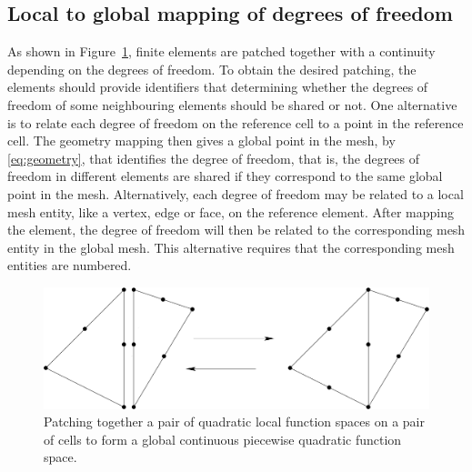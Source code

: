 \subsection{Local to global mapping of degrees of freedom}

As shown in Figure~\ref{fig:kirby-1:patch}, finite elements 
are patched together with a continuity depending on the degrees of freedom.  
To obtain the desired patching, the elements should provide identifiers that determining whether the degrees
of freedom of some neighbouring elements should be shared or not.  
One alternative is to relate each degree of freedom on the reference cell to a point in the
reference cell. The geometry mapping then gives a global point in the mesh, by \eqref{eq:geometry}, that identifies the degree of freedom,
that is, the  degrees of freedom in different elements are shared if they correspond to the same global point in the mesh. 
Alternatively, each degree of freedom may be related to a local mesh entity, like a vertex, edge or face, on the reference element. After mapping the element, the degree of freedom will then be related to the corresponding mesh entity in the global mesh. This alternative requires that the corresponding mesh entities are numbered.      


\begin{figure}
  \begin{center}
    \includegraphics[width=\largefig]{unfinished/kirby-1/pdf/patch.pdf}
    \caption{Patching together a pair of quadratic local function
      spaces on a pair of cells to form a global continuous
      piecewise quadratic function space.}
    \label{fig:kirby-1:patch}
  \end{center}
\end{figure}


